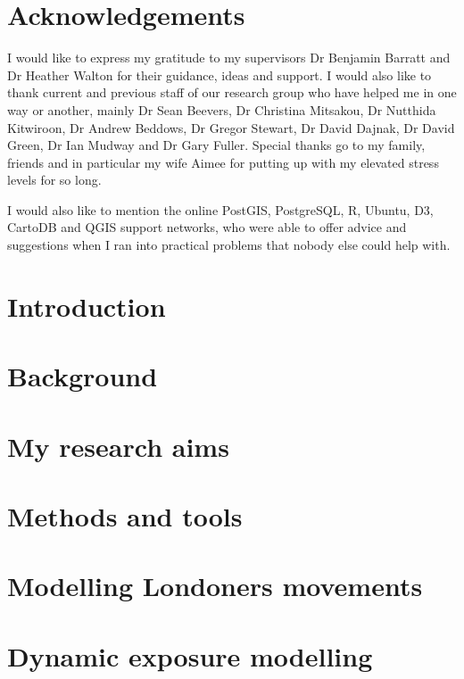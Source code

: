 \documentclass[12pt]{report}
\begin{document}
\chapter*{Acknowledgements}
I would like to express my gratitude to my supervisors Dr Benjamin Barratt and Dr Heather Walton for their guidance, ideas and support. I would also like to thank current and previous staff of our research group who have helped me in one way or another, mainly Dr Sean Beevers, Dr Christina Mitsakou, Dr Nutthida Kitwiroon, Dr Andrew Beddows, Dr Gregor Stewart, Dr David Dajnak, Dr David Green, Dr Ian Mudway and Dr Gary Fuller. Special thanks go to my family, friends and in particular my wife Aimee for putting up with my elevated stress levels for so long.

I would also like to mention the online PostGIS, PostgreSQL, R, Ubuntu, D3, CartoDB and QGIS support networks, who were able to offer advice and suggestions when I ran into practical problems that nobody else could help with. 

\tableofcontents
\listoffigures
\listoftables

\chapter{Introduction}

\label{chap:intro}

\chapter{Background}

\label{chap:background}

\label{chap:dynamic_exposure}

\chapter{My research aims}


\chapter{Methods and tools}


\chapter{Modelling Londoners movements}


\chapter{Dynamic exposure modelling}
\label{chap:the_lhem}

\end{document}
